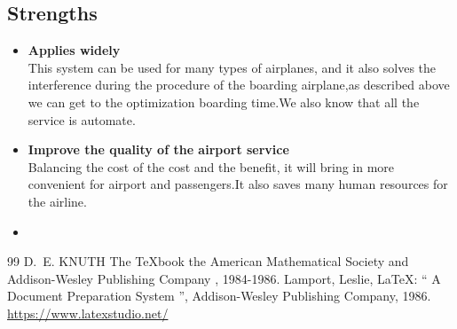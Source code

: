 \documentclass{mcmthesis}
\begin{document}
\subsection{Strengths}
\begin{itemize}
\item \textbf{Applies widely}\\
This  system can be used for many types of airplanes, and it also
solves the interference during  the procedure of the boarding
airplane,as described above we can get to the  optimization
boarding time.We also know that all the service is automate.
\item \textbf{Improve the quality of the airport service}\\
Balancing the cost of the cost and the benefit, it will bring in
more convenient  for airport and passengers.It also saves many
human resources for the airline. \item \textbf{}
\end{itemize}

\begin{thebibliography}{99}
 D.~E. KNUTH   The \TeX{}book  the American
Mathematical Society and Addison-Wesley
Publishing Company , 1984-1986.
Lamport, Leslie,  \LaTeX{}: `` A Document Preparation System '',
Addison-Wesley Publishing Company, 1986.
\url{https://www.latexstudio.net/}
\end{thebibliography}
\end{document}
